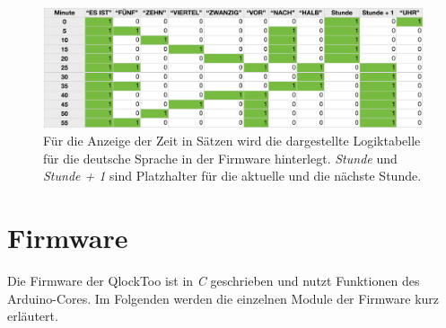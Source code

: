 
\begin{figure}
    \includegraphics[width=\columnwidth]{Abbildungen/Firmware/Logik}
    \caption{Für die Anzeige der Zeit in Sätzen wird die dargestellte Logiktabelle für die deutsche Sprache in der Firmware hinterlegt. \emph{Stunde} und \emph{Stunde + 1} sind Platzhalter für die aktuelle und die nächste Stunde.}
    \label{fig:Logik}
\end{figure}

\section{Firmware}
\label{sec:Firmware}
Die Firmware der QlockToo ist in \emph{C} geschrieben und nutzt Funktionen des Arduino-Cores.
Im Folgenden werden die einzelnen Module der Firmware kurz erläutert.


